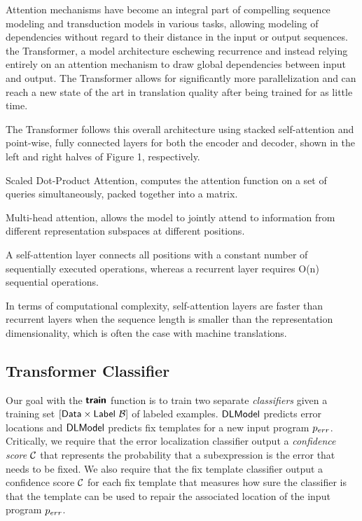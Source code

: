 Attention mechanisms have become an integral part of compelling sequence
modeling and transduction models in various tasks, allowing modeling of
dependencies without regard to their distance in the input or output sequences.
the Transformer, a model architecture eschewing recurrence and instead relying
entirely on an attention mechanism to draw global dependencies between input and
output. The Transformer allows for significantly more parallelization and can
reach a new state of the art in translation quality after being trained for as
little time.

The Transformer follows this overall architecture using stacked self-attention
and point-wise, fully connected layers for both the encoder and decoder, shown
in the left and right halves of Figure 1, respectively.

Scaled Dot-Product Attention, computes the attention function on a set of
queries simultaneously, packed together into a matrix.

Multi-head attention, allows the model to jointly attend to information from
different representation subspaces at different positions.

A self-attention layer connects all positions with a constant number of
sequentially executed operations, whereas a recurrent layer requires O(n)
sequential operations.

In terms of computational complexity, self-attention layers are faster than
recurrent layers when the sequence length is smaller than the representation
dimensionality, which is often the case with machine translations.

\subsection{Transformer Classifier}
\label{sec:seq-classifiers:location-rank}

Our goal with the $\bm{\mathsf{train}}$ function is to train two separate
\emph{classifiers} given a training set $[\mathsf{Data} \times
\mathsf{Label}\ \mathcal{B}]$ of labeled examples. $\mathsf{DLModel}$ predicts error locations and
$\mathsf{DLModel}$ predicts fix templates for a new input program $p_{err}$. Critically, we
require that the error localization classifier output a \emph{confidence score}
$\mathcal{C}$ that represents the probability that a subexpression is the error that
needs to be fixed. We also require that the fix template classifier output a
confidence score $\mathcal{C}$ for each fix template that measures
how sure the classifier is that the template can be used to repair the
associated location of the input program $p_{err}$.

